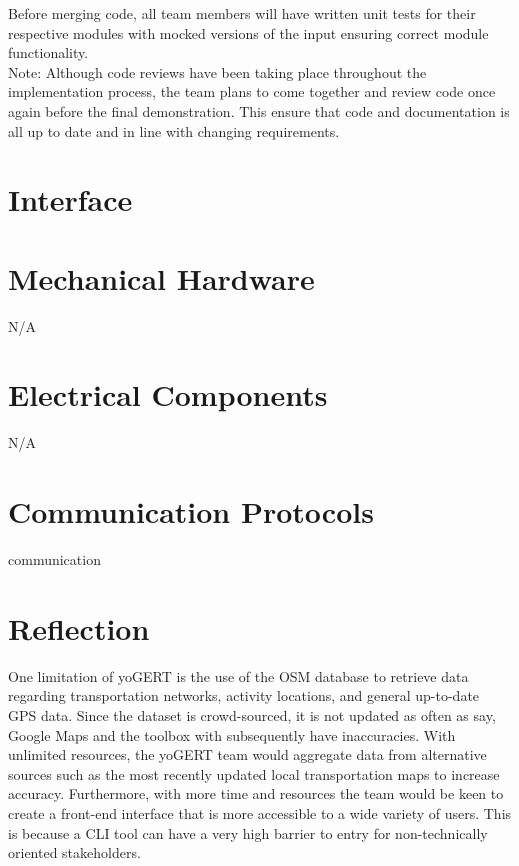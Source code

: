 \documentclass[12pt, titlepage]{article}
\begin{document}
Before merging code, all team members will have written unit tests for their respective modules with mocked versions of the input ensuring correct module functionality. \\

\noindent *Note: Although code reviews have been taking place throughout the implementation process, the team plans to come together and review code once again before the final demonstration. This ensure that code and documentation is all up to date and in line with changing requirements. 



% 

\newpage{}

\appendix

\section{Interface}


\section{Mechanical Hardware}
\noindent N/A
\section{Electrical Components}
\noindent N/A
\section{Communication Protocols}
communication
\section{Reflection}

One limitation of yoGERT is the use of the OSM database to retrieve data regarding transportation networks, activity locations, and general up-to-date GPS data. Since the dataset is crowd-sourced, it is not updated as often as say, Google Maps and the toolbox with subsequently have inaccuracies. With unlimited resources, the yoGERT team would aggregate data from alternative sources such as the most recently updated local transportation maps to increase accuracy. Furthermore, with more time and resources the team would be keen to create a front-end interface that is more accessible to a wide variety of users. This is because a CLI tool can have a very high barrier to entry for non-technically oriented stakeholders. \\
\end{document}
